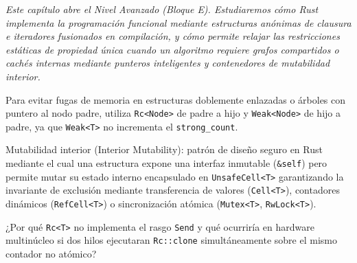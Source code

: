 \documentclass{book}
\begin{document}
\noindent\textit{Este capítulo abre el Nivel Avanzado (Bloque E). Estudiaremos cómo Rust implementa la programación funcional mediante estructuras anónimas de clausura e iteradores fusionados en compilación, y cómo permite relajar las restricciones estáticas de propiedad única cuando un algoritmo requiere grafos compartidos o cachés internas mediante punteros inteligentes y contenedores de mutabilidad interior.}

\begin{tcolorbox}[title={Consejo}, studiumtip, breakable]

Para evitar fugas de memoria en estructuras doblemente enlazadas o árboles con puntero al nodo padre, utiliza \texttt{Rc<Node>} de padre a hijo y \texttt{Weak<Node>} de hijo a padre, ya que \texttt{Weak<T>} no incrementa el \texttt{strong\_count}.
\end{tcolorbox}

\begin{tcolorbox}[title={Definición}, studiumdef, breakable]

Mutabilidad interior (Interior Mutability): patrón de diseño seguro en Rust mediante el cual una estructura expone una interfaz inmutable (\texttt{\&self}) pero permite mutar su estado interno encapsulado en \texttt{UnsafeCell<T>} garantizando la invariante de exclusión mediante transferencia de valores (\texttt{Cell<T>}), contadores dinámicos (\texttt{RefCell<T>}) o sincronización atómica (\texttt{Mutex<T>}, \texttt{RwLock<T>}).
\end{tcolorbox}

\begin{tcolorbox}[title={Autoficha}, studiumcheck, breakable]

¿Por qué \texttt{Rc<T>} no implementa el rasgo \texttt{Send} y qué ocurriría en hardware multinúcleo si dos hilos ejecutaran \texttt{Rc::clone} simultáneamente sobre el mismo contador no atómico?
\end{tcolorbox}
\end{document}
